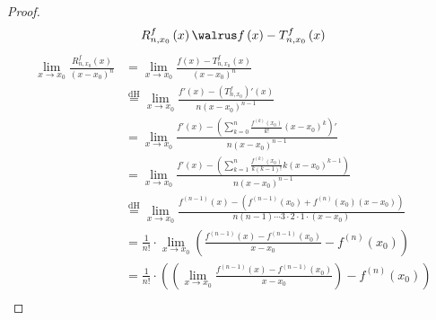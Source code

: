 \begin{proof}
  $$R_{n,x_0}^f\left(x\right)\walrus f\left(x\right)-T_{n,x_0}^f\left(x\right)$$
  \begin{align*}
    \lim_{x\to x_0}\frac{R_{n,x_0}^f\left( x \right)}{\left( x-x_0 \right)^n} & =\lim_{x\to x_0}\frac{f\left(x\right)-T_{n,x_0}^f\left(x\right)}{\left(x-x_0\right)^n}                                                                                                                                                              \\
                                                                              & \stackrel{\text{dH}}{=}\lim_{x\to x_0}\frac{f'\left(x\right)-\left(T_{n,x_0}^f\right)'\left(x\right)}{n\left(x-x_0\right)^{n-1}}                                                                                                                    \\
                                                                              & =\lim_{x\to x_0}\frac{f'\left(x\right)-\left(\sum_{k=0}^n\frac{f^{\left(k\right)}\left(x_0\right)}{k!}\left(x-x_0\right)^{k}\right)'}{n\left(x-x_0\right)^{n-1}}                                                                                    \\
                                                                              & =\lim_{x\to x_0}\frac{f'\left(x\right)-\left(\sum_{k=1}^n\frac{f^{\left(k\right)}\left(x_0\right)}{k\left(k-1\right)!}k\left(x-x_0\right)^{k-1}\right)}{n\left(x-x_0\right)^{n-1}}                                                                  \\
                                                                              & \stackrel{\text{dH}}{=}\lim_{x\to x_0}\frac{f^{\left(n-1\right)}\left(x\right)-\left(f^{\left(n-1\right)}\left(x_0\right)+f^{\left(n\right)}\left(x_0\right)\left(x-x_0\right)\right)}{n\left(n-1\right)\cdots3\cdot2\cdot1\cdot\left(x-x_0\right)} \\
                                                                              & =\frac{1}{n!}\cdot\lim_{x\to x_0}\left(\frac{f^{\left(n-1\right)}\left(x\right)-f^{\left(n-1\right)}\left(x_0\right)}{x-x_0}-f^{\left(n\right)}\left(x_0\right)\right)                                                                              \\
                                                                              & =\frac{1}{n!}\cdot\left(\left(\lim_{x\to x_0}\frac{f^{\left(n-1\right)}\left(x\right)-f^{\left(n-1\right)}\left(x_0\right)}{x-x_0}\right)-f^{\left(n\right)}\left(x_0\right)\right)                                                                 \\

\end{align*}
\end{proof}
